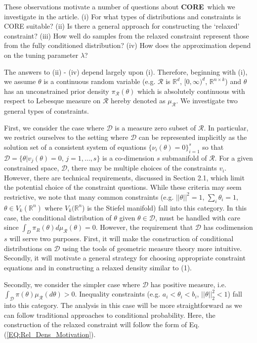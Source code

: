 \documentclass[12 point]{article}
\newcommand{\core}{\textbf{CORE}}
\begin{document}
These observations motivate a number of questions about \core\, which we investigate in the article.  (i) For what types of distributions and constraints is CORE suitable? (ii) Is there a general approach for constructing the `relaxed' constraint? (iii) How well do samples from the relaxed constraint represent those from the fully conditioned distribution? (iv) How does the approximation depend on the tuning parameter $\lambda$? 

The answers to (ii) - (iv) depend largely upon (i).  Therefore, beginning with (i), we assume $\theta$ is a continuous random variable (e.g. $\mathcal{R}$ is $\mathbb{R}^d$, $[0,\infty)^d$, $\mathbb{R}^{n\times k}$) and $\theta$ has an unconstrained prior density $\pi_\mathcal{R}(\theta)$ which is absolutely continuous with respect to Lebesque measure on $\mathcal{R}$ hereby denoted as $\mu_\mathcal{R}$.  We investigate two general types of constraints. 

First, we consider the case where $\mathcal{D}$ is a measure zero subset of $\mathcal{R}$. In particular, we restrict ourselves to the setting where $\mathcal{D}$ can be represented implicitly as the solution set of a consistent system of equations $\{\nu_i(\theta) = 0\}_{i=1}^s$ so that $\mathcal{D} =\{\theta | v_j(\theta) =0, \, j = 1, \dots,s\}$ is a co-dimension $s$ submanifold of $\mathcal{R}$.  For a given constrained space, $\mathcal{D}$, there may be multiple choices of the constraints $v_i$. However, there are technical requirements, discussed in Section 2.1, which limit the potential choice of the constraint questions. While these criteria may seem restrictive, we note that many common constraints (e.g. $||\theta||^2 = 1$, $\sum_i \theta_i = 1$, $\theta \in V_k(\mathbb{R}^n)$ where $V_k(\mathbb{R}^n$) is the Stiefel manifold) fall into this category.  In this case, the conditional distribution of $\theta$ given $\theta \in \mathcal{D}$, must be handled with care since $\int_D \pi_R(\theta) d\mu_\mathcal{R} (\theta) =0$.  However, the requirement that $\mathcal{D}$ has codimension $s$ will serve two purposes.  First, it will make the construction of conditional distributions on $\mathcal{D}$ using the tools of geometric measure theory more intuitive.  Secondly, it will motivate a general strategy for choosing appropriate constraint equations and in constructing a relaxed density similar to (1).

Secondly, we consider the simpler case where $\mathcal{D}$ has positive measure, i.e. $\int_\mathcal{D} \pi(\theta) \mu_\mathcal{R}(d\theta) >0.$ Inequality constraints (e.g. $a_i < \theta_i < b_i$, $||\theta||_2^2 < 1$) fall into this category. The analysis in this case will be more straightforward as we can follow traditional approaches to conditional probability. Here, the construction of the relaxed constraint will follow the form of Eq. (\ref{EQ:Rel_Dens_Motivation}).
\end{document}
